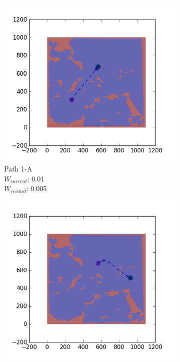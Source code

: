 \documentclass{tamuccthesis}
\begin{document}
\begin{figure}
    \centering
    \begin{subfigure}[b]{0.24\textwidth}
        \centering
            \includegraphics[width=\textwidth,trim={4cm 3cm 2cm 3cm},clip]{EXP3RG_PathAa_-1_-1_0d01_0d005.png}
        \caption[]{{\small Path 1-A \\ $W_{current}$: 0.01 \\ $W_{reward}$: 0.005}}    
        \label{fig:Path_1-A_upReward_upWork_b}
    \end{subfigure}
    \begin{subfigure}[b]{0.24\textwidth}  
        \centering 
        \includegraphics[width=\textwidth,trim={4cm 3cm 2cm 3cm},clip]{EXP3RG_PathBa_-1_-1_0d01_0d005.png}

\end{subfigure}
\end{figure}
\end{document}
